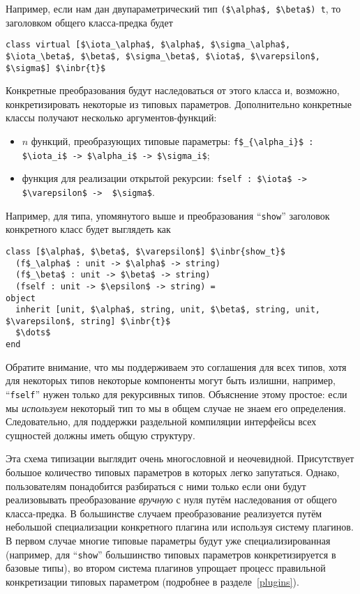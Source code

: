 Например, если нам дан двупараметрический тип \lstinline{($\alpha$, $\beta$) t}, то заголовком общего класса-предка будет 

\begin{lstlisting}
class virtual [$\iota_\alpha$, $\alpha$, $\sigma_\alpha$, $\iota_\beta$, $\beta$, $\sigma_\beta$, $\iota$, $\varepsilon$, $\sigma$] $\inbr{t}$
\end{lstlisting}

Конкретные преобразования будут наследоваться от этого класса и, возможно, конкретизировать некоторые из типовых параметров.
Дополнительно конкретные классы получают несколько аргументов-функций:

\begin{itemize}
\item $n$ функций, преобразующих типовые параметры: \lstinline|f$_{\alpha_i}$ : $\iota_i$ -> $\alpha_i$ -> $\sigma_i$|;
\item функция для реализации открытой рекурсии: \lstinline|fself : $\iota$ -> $\varepsilon$ ->  $\sigma$|.
\end{itemize}

Например, для типа, упомянутого выше и преобразования ``\lstinline{show}'' заголовок конкретного класс будет выглядеть как

\begin{lstlisting}
class [$\alpha$, $\beta$, $\varepsilon$] $\inbr{show_t}$ 
  (f$_\alpha$ : unit -> $\alpha$ -> string)
  (f$_\beta$ : unit -> $\beta$ -> string)
  (fself : unit -> $\epsilon$ -> string) =
object 
  inherit [unit, $\alpha$, string, unit, $\beta$, string, unit, $\varepsilon$, string] $\inbr{t}$
  $\dots$
end 
\end{lstlisting}

Обратите внимание, что мы поддерживаем это соглашения для всех типов, хотя для некоторых типов некоторые компоненты могут быть излишни, например, ``\lstinline{fself}''
нужен только для рекурсивных типов. Объяснение этому простое: если мы \emph{используем} некоторый тип
то мы в общем случае не знаем его определения. Следовательно, для поддержки раздельной компиляции интерфейсы всех сущностей должны иметь общую структуру.

Эта схема типизации выглядит очень многословной и неочевидной. Присутствует большое количество типовых параметров в которых легко запутаться.
Однако, пользователям понадобится разбираться с ними только если они будут реализовывать преобразование \emph{вручную} с нуля путём 
наследования от общего класса-предка.
В большинстве случаем преобразование реализуется путём небольшой специализации конкретного плагина или используя систему плагинов. 
В первом случае многие типовые параметры будут уже специализированная (например, для  ``\lstinline{show}'' большинство типовых параметров конкретизируется в базовые типы), во втором система плагинов упрощает процесс правильной конкретизации типовых параметром (подробнее в 
разделе~\ref{plugins}).

